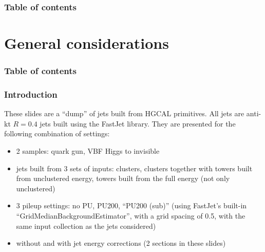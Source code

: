 \documentclass[8pt]{beamer}
\author{E. Chapon}
\date{Sep. 9, 2020}
\begin{document}
\begin{frame}
 \frametitle{Table of contents}
 
 \tableofcontents
\end{frame}

\section{General considerations}


\begin{frame}
 \frametitle{Table of contents}
 
\end{frame}

\begin{frame}
 \frametitle{Introduction}
 
 These slides are a ``dump'' of jets built from HGCAL primitives. All jets are anti-kt $R=0.4$ jets built using the FastJet library. They are presented for the following combination of settings:
 
 \begin{itemize}
  \item 2 samples: quark gun, VBF Higgs to invisible 
  \item jets built from 3 sets of inputs: clusters, clusters together with towers built from unclustered energy, towers built from the full energy (not only unclustered)
  \item 3 pileup settings: no PU, PU200, ``PU200 (sub)'' (using FastJet's built-in ``GridMedianBackgroundEstimator'', with a grid spacing of 0.5, with the same input collection as the jets considered)
  \item without and with jet energy corrections (2 sections in these slides)
 \end{itemize}

\end{frame}



%  
\end{document}
